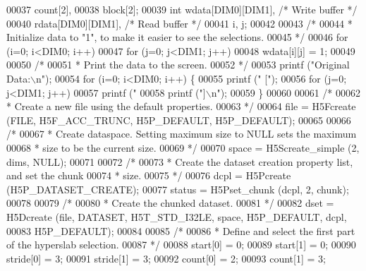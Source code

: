\begin{DoxyCode}
00037                     count[2],
00038                     block[2];
00039     \textcolor{keywordtype}{int}             wdata[DIM0][DIM1],          \textcolor{comment}{/* Write buffer */}
00040                     rdata[DIM0][DIM1],          \textcolor{comment}{/* Read buffer */}
00041                     i, j;
00042 
00043     \textcolor{comment}{/*}
00044 \textcolor{comment}{     * Initialize data to "1", to make it easier to see the selections.}
00045 \textcolor{comment}{     */}
00046     \textcolor{keywordflow}{for} (i=0; i<DIM0; i++)
00047         \textcolor{keywordflow}{for} (j=0; j<DIM1; j++)
00048             wdata[i][j] = 1;
00049 
00050     \textcolor{comment}{/*}
00051 \textcolor{comment}{     * Print the data to the screen.}
00052 \textcolor{comment}{     */}
00053     printf (\textcolor{stringliteral}{"Original Data:\(\backslash\)n"});
00054     \textcolor{keywordflow}{for} (i=0; i<DIM0; i++) \{
00055         printf (\textcolor{stringliteral}{" ["});
00056         \textcolor{keywordflow}{for} (j=0; j<DIM1; j++)
00057             printf (\textcolor{stringliteral}{" %
00058         printf (\textcolor{stringliteral}{"]\(\backslash\)n"});
00059     \}
00060 
00061     \textcolor{comment}{/*}
00062 \textcolor{comment}{     * Create a new file using the default properties.}
00063 \textcolor{comment}{     */}
00064     file = H5Fcreate (FILE, H5F\_ACC\_TRUNC, H5P\_DEFAULT, H5P\_DEFAULT);
00065 
00066     \textcolor{comment}{/*}
00067 \textcolor{comment}{     * Create dataspace.  Setting maximum size to NULL sets the maximum}
00068 \textcolor{comment}{     * size to be the current size.}
00069 \textcolor{comment}{     */}
00070     space = H5Screate\_simple (2, dims, NULL);
00071 
00072     \textcolor{comment}{/*}
00073 \textcolor{comment}{     * Create the dataset creation property list, and set the chunk}
00074 \textcolor{comment}{     * size.}
00075 \textcolor{comment}{     */}
00076     dcpl = H5Pcreate (H5P\_DATASET\_CREATE);
00077     status = H5Pset\_chunk (dcpl, 2, chunk);
00078 
00079     \textcolor{comment}{/*}
00080 \textcolor{comment}{     * Create the chunked dataset.}
00081 \textcolor{comment}{     */}
00082     dset = H5Dcreate (file, DATASET, H5T\_STD\_I32LE, space, H5P\_DEFAULT, dcpl,
00083                 H5P\_DEFAULT);
00084 
00085     \textcolor{comment}{/*}
00086 \textcolor{comment}{     * Define and select the first part of the hyperslab selection.}
00087 \textcolor{comment}{     */}
00088     start[0] = 0;
00089     start[1] = 0;
00090     stride[0] = 3;
00091     stride[1] = 3;
00092     count[0] = 2;
00093     count[1] = 3;
}
\end{DoxyCode}
